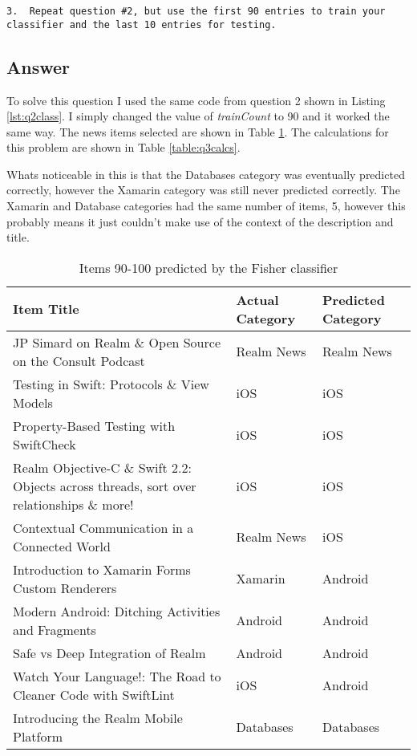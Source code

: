 \documentclass[letterpaper,11pt]{article}
\begin{document}
\begin{verbatim}
3.  Repeat question #2, but use the first 90 entries to train your
classifier and the last 10 entries for testing.
\end{verbatim}

\subsection*{Answer}

To solve this question I used the same code from question 2 shown in Listing \ref{lst:q2class}. I simply changed the value of \textit{trainCount} to 90 and it worked the same way. The news items selected are shown in Table \ref{table:q3classified}. The calculations for this problem are shown in Table \ref{table:q3calcs}.

Whats noticeable in this is that the Databases category was eventually predicted correctly, however the Xamarin category was still never predicted correctly. The Xamarin and Database categories had the same number of items, 5, however this probably means it just couldn't make use of the context of the description and title.

\begin{table}[h]
\centering
\begin{adjustbox}{max width=\linewidth}
\begin{tabular}{ | l | l | l |}
\hline
\textbf{Item Title} & \textbf{Actual Category} & \textbf{Predicted Category} \\
\hline
JP Simard on Realm \& Open Source on the Consult Podcast & Realm News & Realm News \\
Testing in Swift: Protocols \& View Models & iOS & iOS \\
Property-Based Testing with SwiftCheck & iOS & iOS \\
Realm Objective-C \& Swift 2.2: Objects across threads, sort over relationships \& more! & iOS & iOS \\
Contextual Communication in a Connected World & Realm News & iOS \\
Introduction to Xamarin Forms Custom Renderers & Xamarin & Android \\
Modern Android: Ditching Activities and Fragments & Android & Android \\
Safe vs Deep Integration of Realm & Android & Android \\
Watch Your Language!: The Road to Cleaner Code with SwiftLint & iOS & Android \\
Introducing the Realm Mobile Platform & Databases & Databases \\
\hline
\end{tabular}
\end{adjustbox}
\caption{Items 90-100 predicted by the Fisher classifier}
\label{table:q3classified}
\end{table}
\end{document}
